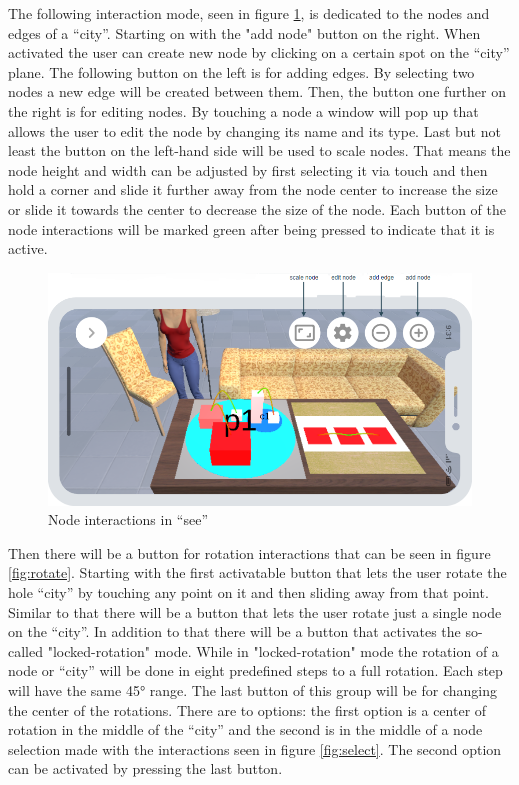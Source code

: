 The following interaction mode, seen in figure \ref{fig:nodes}, is dedicated to the nodes and edges of a \enquote{\gls{city}}.
Starting on with the "add node" button on the right.
When activated the user can create new node by clicking on a certain spot on the \enquote{\gls{city}} plane. 
The following button on the left is for adding edges.
By selecting two nodes a new edge will be created between them. 
Then, the button one further on the right is for editing nodes.
By touching a node a window will pop up that allows the user to edit the node by changing its name and its type.
Last but not least the button on the left-hand side will be used to scale nodes.
That means the node height and width can be adjusted by first selecting it via touch and then hold a corner and slide it further away from the node center to increase the size or slide it towards the center to decrease the size of the node.
Each button of the node interactions will be marked green after being pressed to indicate that it is active.

\begin{figure}[htb]
    \centering
    \includegraphics[width=1\textwidth]{Concept/img/menu3.png}
    \caption{Node interactions in \enquote{\gls{see}}}\label{fig:nodes}
\end{figure}

Then there will be a button for rotation interactions that can be seen in figure \ref{fig:rotate}.
Starting with the first activatable button that lets the user rotate the hole \enquote{\gls{city}} by touching any point on it and then sliding away from that point.
Similar to that there will be a button that lets the user rotate just a single node on the \enquote{\gls{city}}.
In addition to that there will be a button that activates the so-called "locked-rotation" mode.
While in "locked-rotation" mode the rotation of a node or \enquote{\gls{city}} will be done in eight predefined steps to a full rotation.
Each step will have the same 45° range.
The last button of this group will be for changing the center of the rotations. 
There are to options: the first option is a center of rotation in the middle of the \enquote{\gls{city}} and the second is in the middle of a node selection made with the interactions seen in figure \ref{fig:select}.
The second option can be activated by pressing the last button.

